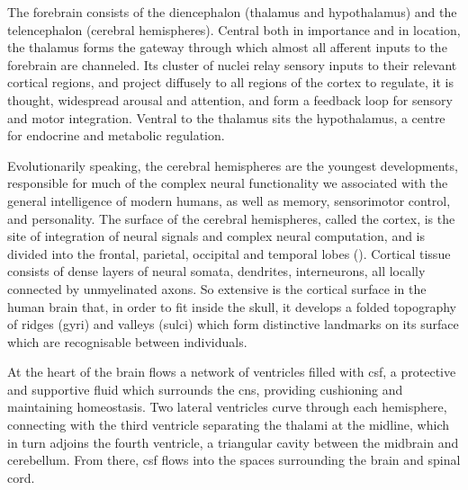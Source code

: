 The forebrain consists of the diencephalon (thalamus and hypothalamus) and the telencephalon (cerebral hemispheres).
Central both in importance and in location, the thalamus forms the gateway through which almost all afferent inputs to the forebrain are channeled.
Its cluster of nuclei relay sensory inputs to their relevant cortical regions, and project diffusely to all regions of the cortex to regulate, it is thought, widespread arousal and attention, and form a feedback loop for sensory and motor integration.
Ventral to the thalamus sits the hypothalamus, a centre for endocrine and metabolic regulation.

Evolutionarily speaking, the cerebral hemispheres are the youngest developments, responsible for much of the complex neural functionality we associated with the general intelligence of modern humans, as well as memory, sensorimotor control, and personality.
The surface of the cerebral hemispheres, called the cortex, is the site of integration of neural signals and complex neural computation, and is divided into the frontal, parietal, occipital and temporal lobes ().
Cortical tissue consists of dense layers of neural somata, dendrites, interneurons, all locally connected by unmyelinated axons.
So extensive is the cortical surface in the human brain that, in order to fit inside the skull, it develops a folded topography of ridges (gyri) and valleys (sulci) which form distinctive landmarks on its surface which are recognisable between individuals.

At the heart of the brain flows a network of ventricles filled with \gls{csf}, a protective and supportive fluid which surrounds the \gls{cns}, providing cushioning and maintaining homeostasis.\autocite{Wichmann2022}
Two lateral ventricles curve through each hemisphere, connecting with the third ventricle separating the thalami at the midline, which in turn adjoins the fourth ventricle, a triangular cavity between the midbrain and cerebellum.
From there, \gls{csf} flows into the spaces surrounding the brain and spinal cord.

